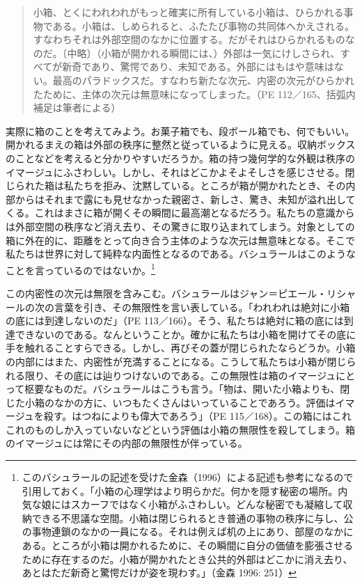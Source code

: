 \documentclass[b5j,twoside,twocolumn]{utarticle}
\begin{document}
\begin{quote}
小箱、とくにわれわれがもっと確実に所有している小箱は、ひらかれる事物である。小箱は、しめられると、ふたたび事物の共同体へかえされる。すなわちそれは外部空間のなかに位置する。だがそれはひらかれるものなのだ。〔中略〕（小箱が開かれる瞬間には、）外部は一気にけしさられ、すべてが新奇であり、驚愕であり、未知である。外部にはもはや意味はない。最高のパラドックスだ。すなわち新たな次元、内密の次元がひらかれたために、主体の次元は無意味になってしまった。（PE 112／165、括弧内補足は筆者による）
\end{quote}
実際に箱のことを考えてみよう。お菓子箱でも、段ボール箱でも、何でもいい。開かれるまえの箱は外部の秩序に整然と従っているように見える。収納ボックスのことなどを考えると分かりやすいだろうか。箱の持つ幾何学的な外観は秩序のイマージュにふさわしい。しかし、それはどこかよそよそしさを感じさせる。閉じられた箱は私たちを拒み、沈黙している。ところが箱が開かれたとき、その内部からはそれまで露にも見せなかった親密さ、新しさ、驚き、未知が溢れ出してくる。これはまさに箱が開くその瞬間に最高潮となるだろう。私たちの意識からは外部空間の秩序など消え去り、その驚きに取り込まれてしまう。対象としての箱に外在的に、距離をとって向き合う主体のような次元は無意味となる。そこで私たちは世界に対して純粋な内面性となるのである。バシュラールはこのようなことを言っているのではないか。\footnote{このバシュラールの記述を受けた金森（1996）による記述も参考になるので引用しておく。「小箱の心理学はより明らかだ。何かを隠す秘密の場所。内気な娘にはスカーフではなく小箱がふさわしい。どんな秘密でも凝縮して収納できる不思議な空間。小箱は閉じられるとき普通の事物の秩序に与し、公の事物連鎖のなかの一員になる。それは例えば机の上にあり、部屋のなかにある。ところが小箱は開かれるために、その瞬間に自分の価値を膨張させるために存在するのだ。小箱が開かれたとき公共的外部はどこかに消え去り、あとはただ新奇と驚愕だけが姿を現わす。」（金森 1996: 251）}


この内密性の次元は無限を含みこむ。バシュラールはジャン＝ピエール・リシャールの次の言葉を引き、その無限性を言い表している。「われわれは絶対に小箱の底には到達しないのだ」（PE 113／166）。そう、私たちは絶対に箱の底には到達できないのである。なんということか。確かに私たちは小箱を開けてその底に手を触れることすらできる。しかし、再びその蓋が閉じられたならどうか。小箱の内部にはまた、内密性が充満することになる。こうして私たちは小箱が閉じられる限り、その底には辿りつけないのである。この無限性は箱のイマージュにとって枢要なものだ。バシュラールはこうも言う。「物は、開いた小箱よりも、閉じた小箱のなかの方に、いつもたくさんはいっていることであろう。評価はイマージュを殺す。はつねによりも偉大であろう」（PE 115／168）。この箱にはこれこれのものしか入っていないなどという評価は小箱の無限性を殺してしまう。箱のイマージュには常にその内部の無限性が伴っている。
\end{document}
